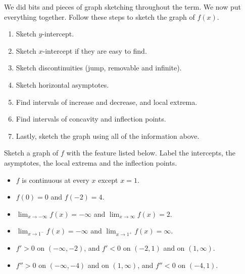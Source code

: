 \documentclass[../main.tex]{subfiles}
\begin{document}
We did bits and pieces of graph sketching throughout the term. We now put everything together.  Follow these steps to sketch the graph of \(f(x)\).
\begin{enumerate}
  \item Sketch \(y\)-intercept.
  \item Sketch \(x\)-intercept if they are easy to find.
  \item Sketch discontinuities (jump, removable and infinite).
  \item Sketch horizontal asymptotes.
  \item Find intervals of increase and decrease, and local extrema.
  \item Find intervals of concavity and inflection points.
  \item Lastly, sketch the graph using all of the information above.
\end{enumerate}
\begin{exercise}
  Sketch a graph of \(f\) with the feature listed below. Label the intercepts, the asymptotes, the local extrema and the inflection points.

  \begin{itemize}
    \item \(f\) is continuous at every \(x\) except \(x = 1\).
    \item \(f(0) = 0\) and \(f(-2) = 4\).
    \item \(\displaystyle\lim_{x \to -\infty} f(x) = -\infty\) and \(\displaystyle\lim_{x \to \infty} f(x) = 2\).
    \item \(\displaystyle\lim_{x \to 1^{-}} f(x) = -\infty\) and \(\displaystyle\lim_{x \to 1^{+}} f(x) = \infty\).
    \item \(f' > 0\) on \((-\infty, -2)\), and \(f' < 0\) on \((-2, 1)\) and on \((1, \infty)\).
    \item \(f'' > 0\) on \((-\infty, -4)\) and on \((1, \infty)\), and \(f'' < 0\) on \((-4, 1)\).
  \end{itemize}

  \begin{center}
    
  \end{center}
\end{exercise}
\clearpage
\end{document}
